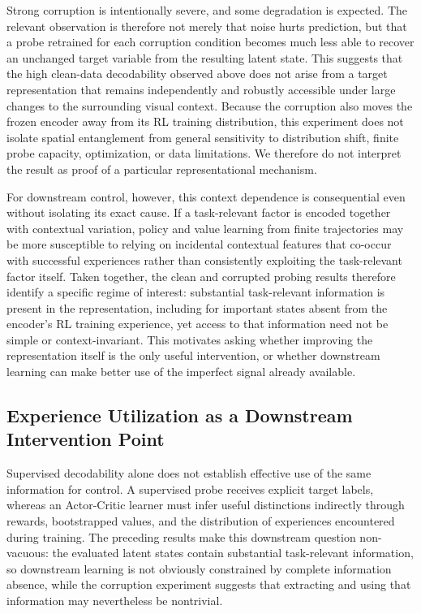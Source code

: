 \documentclass{article} %
\begin{document}
Strong corruption is intentionally severe, and some degradation is expected. The relevant observation is therefore not merely that noise hurts prediction, but that a probe retrained for each corruption condition becomes much less able to recover an unchanged target variable from the resulting latent state. This suggests that the high clean-data decodability observed above does not arise from a target representation that remains independently and robustly accessible under large changes to the surrounding visual context. Because the corruption also moves the frozen encoder away from its RL training distribution, this experiment does not isolate spatial entanglement from general sensitivity to distribution shift, finite probe capacity, optimization, or data limitations. We therefore do not interpret the result as proof of a particular representational mechanism.

For downstream control, however, this context dependence is consequential even without isolating its exact cause. If a task-relevant factor is encoded together with contextual variation, policy and value learning from finite trajectories may be more susceptible to relying on incidental contextual features that co-occur with successful experiences rather than consistently exploiting the task-relevant factor itself. Taken together, the clean and corrupted probing results therefore identify a specific regime of interest: substantial task-relevant information is present in the representation, including for important states absent from the encoder's RL training experience, yet access to that information need not be simple or context-invariant. This motivates asking whether improving the representation itself is the only useful intervention, or whether downstream learning can make better use of the imperfect signal already available.

\subsection{Experience Utilization as a Downstream Intervention Point}
\label{subsec:ac_intervention}

Supervised decodability alone does not establish effective use of the same information for control. A supervised probe receives explicit target labels, whereas an Actor-Critic learner must infer useful distinctions indirectly through rewards, bootstrapped values, and the distribution of experiences encountered during training. The preceding results make this downstream question non-vacuous: the evaluated latent states contain substantial task-relevant information, so downstream learning is not obviously constrained by complete information absence, while the corruption experiment suggests that extracting and using that information may nevertheless be nontrivial.
\end{document}
